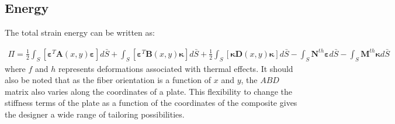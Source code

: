 \documentclass[journal]{new-aiaa}
\begin{document}
\subsection{Energy}

The total strain energy can be written as:



\begin{align}
{\Pi}= \frac{1}{2}\int_{S}\left[\boldsymbol\varepsilon^T\boldsymbol A(x,y)\boldsymbol \varepsilon\right]d\bar{S} + \int_{S}\left[\boldsymbol\varepsilon^T{\boldsymbol B(x,y)}\boldsymbol\kappa\right]d\bar{S} + \frac{1}{2}\int_{S}\left[\boldsymbol \kappa\boldsymbol D(x,y) \boldsymbol\kappa\right]d\bar{S} - \int_{S} \boldsymbol N^{th}\boldsymbol\varepsilon d\bar{S} - \int_{S} \boldsymbol M^{th}\boldsymbol\kappa d\bar{S}
\end{align}
where $f$ and $h$ represents deformations associated with thermal effects.
It should also be noted that as the fiber orientation is a function of $x$ and $y$, the ${ABD}$ matrix also varies along the coordinates of a plate. This flexibility to change the stiffness terms of the plate as a function of the coordinates of the composite gives the designer a wide range of tailoring possibilities.
\end{document}
